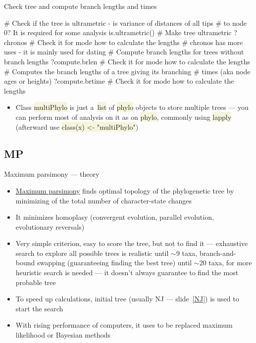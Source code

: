 \documentclass[compress, ucs, xelatex, 11pt, xcolor=svgnames, aspectratio=169,
	hyperref={
		bookmarks=true,
		unicode=true,
		colorlinks=true,
		pdftitle={Molecular data in R},
		plainpages=false,
		pdfauthor={Vojtech Zeisek},
		pdfsubject={Course about phylogeny and evolution in R},
		pdfcreator={XeLaTeX},
		pdfkeywords={R, evolution, phylogeny, molecular data},
		linkcolor=Crimson, %
		anchorcolor=Magenta, %
		citecolor=Magenta, %
		filecolor=Magenta, %
		menucolor=Magenta, %
		urlcolor=DodgerBlue, %
		pdftex},
	url={hyphens, lowtilde} %
	]{beamer}
\renewcommand{\texttt}[1]{\colorbox{Beige}{{\ttfamily #1}}}
\begin{document}
\begin{frame}[fragile]{Check tree and compute branch lengths and times}
	\begin{spluscode}
    # Check if the tree is ultrametric - is variance of distances of all tips
    # to node 0? It is required for some analysis
    is.ultrametric()
    # Make tree ultrametric
    ?chronos # Check it for mode how to calculate the lengths
    # chronos has more uses - it is mainly used for dating
    # Compute branch lengths for trees without branch lengths
    ?compute.brlen # Check it for mode how to calculate the lengths
    # Computes the branch lengths of a tree giving its branching
    # times (aka node ages or heights)
    ?compute.brtime # Check it for mode how to calculate the lengths
	\end{spluscode}
	\begin{itemize}
		\item Class \texttt{multiPhylo} is just a~\texttt{list} of \texttt{phylo} objects to store multiple trees --- you can perform most of analysis on it as on \texttt{phylo}, commonly using \texttt{lapply} (afterward use \texttt{class(x) <- "multiPhylo"})
	\end{itemize}
\end{frame}

\subsection{MP}

\begin{frame}{Maximum parsimony --- theory}
	\label{MP}
	\begin{itemize}
		\item \href{https://en.wikipedia.org/wiki/Maximum_parsimony_(phylogenetics)}{Maximum parsimony} finds optimal topology of the phylogenetic tree by minimizing of the total number of character-state changes
		\item It minimizes homoplasy (convergent evolution, parallel evolution, evolutionary reversals)
		\item Very simple criterion, easy to score the tree, but not to find it --- exhaustive search to explore all possible trees is realistic until $\sim$9 taxa, branch-and-bound swapping (guaranteeing finding the best tree) until $\sim$20 taxa, for more heuristic search is needed --- it doesn't always guarantee to find the most probable tree
		\item To speed up calculations, initial tree (usually NJ --- slide~\ref{NJ}) is used to start the search
		\item With rising performance of computers, it uses to be replaced maximum likelihood or Bayesian methods
	\end{itemize}
\end{frame}
\end{document}
